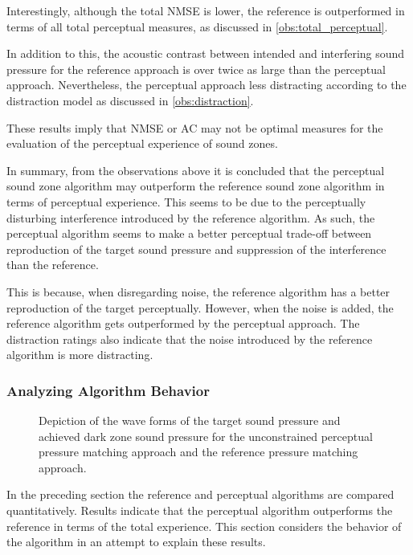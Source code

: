 \begin{enumerate}
        Interestingly, although the total NMSE is lower, the reference is outperformed in terms of all total perceptual 
        measures, as discussed in \autoref{obs:total_perceptual}.

        In addition to this, the acoustic contrast between intended and interfering sound pressure for 
        the reference approach is over twice as large than the perceptual approach.
        Nevertheless, the perceptual approach less distracting according to the distraction model as 
        discussed in \autoref{obs:distraction}.

        These results imply that NMSE or AC may not be optimal measures for the evaluation of the  
        perceptual experience of sound zones.
        \label{obs:physical}
\end{enumerate}

In summary, from the observations above it is concluded that the perceptual sound zone algorithm may
outperform the reference sound zone algorithm in terms of perceptual experience.
This seems to be due to the perceptually disturbing interference introduced by the reference algorithm.
As such, the perceptual algorithm seems to make a better perceptual trade-off between reproduction of the 
target sound pressure and suppression of the interference than the reference.

This is because, when disregarding noise, the reference algorithm has a better reproduction of the target perceptually.
However, when the noise is added, the reference algorithm gets outperformed by the perceptual approach.
The distraction ratings also indicate that the noise introduced by the reference algorithm is more distracting.

\subsubsection*{Analyzing Algorithm Behavior}
\begin{figure}[]
    \centering
    
    \caption{Depiction of the wave forms of the target sound pressure and achieved dark zone sound pressure for the 
        unconstrained perceptual pressure matching approach and the reference pressure matching approach.}
        \label{fig:results:evaluation:unconstrained_results:behavior}
\end{figure}

In the preceding section the reference and perceptual algorithms are compared quantitatively.
Results indicate that the perceptual algorithm outperforms the reference in terms of the total experience.
This section considers the behavior of the algorithm in an attempt to explain these results.

